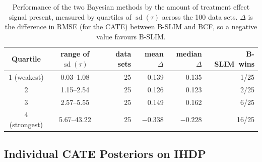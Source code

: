 \documentclass[12pt]{article}
\begin{document}
\begin{table}[H]
\centering\footnotesize
\caption{IHDP benchmark. Results over 100 replicates using 10-fold out-of-sample predictions. Values are mean (standard error) unless stated. RMSE is for the CATE. The mean rank is the average rank by RMSE across the 100 data sets.}
\label{tab:ihdp_primary}
\end{table}

\begin{table}[H]
\centering\small
\caption{Performance of the two Bayesian methods by the amount of treatment
effect signal present, measured by quartiles of $\operatorname{sd}(\tau)$ across
the 100 data sets. $\Delta$ is the difference in RMSE (for the CATE) between B-SLIM and BCF, so a negative value favours B-SLIM.}
\label{tab:ihdp_signal_bands}
\begin{tabular}{ccrrrr}
\toprule
Quartile & range of $\operatorname{sd}(\tau)$ & data sets & mean $\Delta$ & median $\Delta$ & B-SLIM\ wins\\
\midrule
1 (weakest) & 0.03--1.08 & 25 & 0.139 & 0.135 & 1/25\\
2 & 1.15--2.54 & 25 & 0.126 & 0.123 & 2/25\\
3 & 2.57--5.55 & 25 & 0.149 & 0.162 & 6/25\\
4 (strongest) & 5.67--43.22 & 25 & $-0.338$ & $-0.228$ & 16/25\\
\bottomrule
\end{tabular}
\end{table}

\subsection{Individual CATE Posteriors on IHDP}
\label{subsec:ihdp_posterior}
\end{document}
